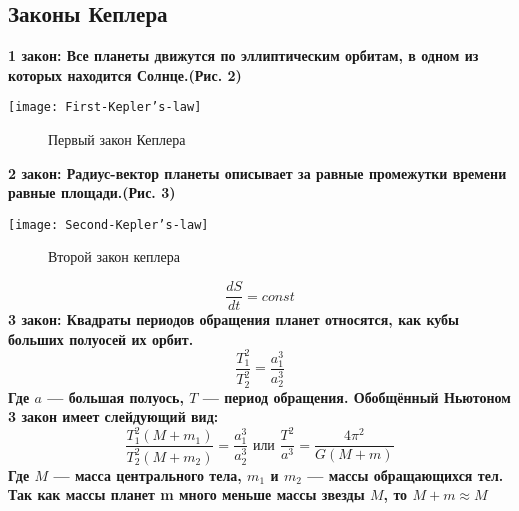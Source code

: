 \subsection{Законы Кеплера}
\bfseries 1 закон: \mdseries  Все планеты движутся по эллиптическим орбитам, в одном из которых находится Солнце.(Рис. 2)
\begin{center}
\texttt{[image: First-Kepler's-law]}
\begin{figure}[h!]
\caption {Первый закон Кеплера}
\end{figure}
\end{center}

\bfseries 2 закон: \mdseries Радиус-вектор планеты описывает за равные промежутки времени равные площади.(Рис. 3)
\begin{center}
\texttt{[image: Second-Kepler's-law]}
\begin{figure}[h!]
\caption {Второй закон кеплера}
\end{figure}
\end{center}$$\frac{dS}{dt}=const$$
\bfseries 3 закон: \mdseries Квадраты периодов обращения планет относятся, как кубы больших полуосей их орбит.
$$\frac{T^2_1}{T^2_2}=\frac{a^3_1}{a^3_2}$$
Где $a$ --- большая полуось, $T$ --- период обращения.
Обобщённый Ньютоном 3 закон имеет слейдующий вид:
$$\frac{T^2_1(M+m_1)}{T^2_2(M+m_2)}=\frac{a^3_1}{a^3_2} \text{ или } \frac{T^2}{a^3}=\frac{4\pi^2}{G(M+m)}$$
Где $M$ --- масса центрального тела, $m_1$ и $m_2$ --- массы обращающихся тел. Так как массы планет m много меньше массы звезды $M$, то $M+m\approx M$
